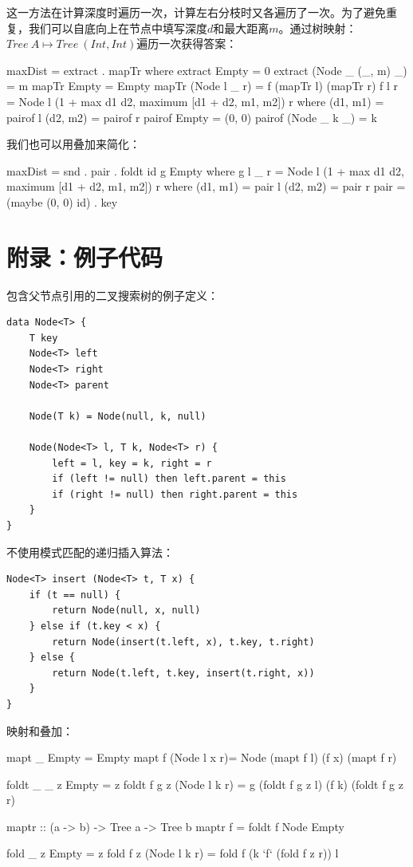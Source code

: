 \documentclass[b5paper]{ctexart}
\begin{document}
\begin{Answer}[ref={ex:bst-delete}]
{这一方法在计算深度时遍历一次，计算左右分枝时又各遍历了一次。为了避免重复，我们可以自底向上在节点中填写深度$d$和最大距离$m$。通过树映射：$Tree\ A \mapsto Tree\ (Int, Int)$遍历一次获得答案：

\begin{Haskell}
maxDist = extract . mapTr where
  extract Empty = 0
  extract (Node _ (_, m) _) = m
  mapTr Empty = Empty
  mapTr (Node l _ r) = f (mapTr l) (mapTr r)
  f l r = Node l (1 + max d1 d2, maximum [d1 + d2, m1, m2]) r where
    (d1, m1) = pairof l
    (d2, m2) = pairof r
    pairof Empty = (0, 0)
    pairof (Node _ k _) = k
\end{Haskell}

我们也可以用叠加来简化：

\begin{Haskell}
maxDist = snd . pair . foldt id g Empty where
  g l _ r = Node l (1 + max d1 d2, maximum [d1 + d2, m1, m2]) r where
    (d1, m1) = pair l
    (d2, m2) = pair r
  pair = (maybe (0, 0) id) . key
\end{Haskell}
}
\end{Answer}

\section{附录：例子代码}

包含父节点引用的二叉搜索树的例子定义：

\lstset{language=Bourbaki, frame=single}
\begin{lstlisting}
data Node<T> {
    T key
    Node<T> left
    Node<T> right
    Node<T> parent

    Node(T k) = Node(null, k, null)

    Node(Node<T> l, T k, Node<T> r) {
        left = l, key = k, right = r
        if (left != null) then left.parent = this
        if (right != null) then right.parent = this
    }
}
\end{lstlisting}

不使用模式匹配的递归插入算法：

\begin{lstlisting}
Node<T> insert (Node<T> t, T x) {
    if (t == null) {
        return Node(null, x, null)
    } else if (t.key < x) {
        return Node(insert(t.left, x), t.key, t.right)
    } else {
        return Node(t.left, t.key, insert(t.right, x))
    }
}
\end{lstlisting}

映射和叠加：
\begin{Haskell}
mapt _ Empty = Empty
mapt f (Node l x r)= Node (mapt f l) (f x) (mapt f r)

foldt _ _ z Empty = z
foldt f g z (Node l k r) = g (foldt f g z l) (f k) (foldt f g z r)

maptr :: (a -> b) -> Tree a -> Tree b
maptr f = foldt f Node Empty

fold _ z Empty = z
fold f z (Node l k r) = fold f (k `f` (fold f z r)) l
\end{Haskell}
\end{document}
